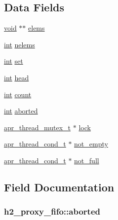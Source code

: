 \subsection*{Data Fields}
\begin{DoxyCompactItemize}
\item 
\hyperlink{group__MOD__ISAPI_gacd6cdbf73df3d9eed42fa493d9b621a6}{void} $\ast$$\ast$ \hyperlink{structh2__proxy__fifo_a78e95da59626360d3d43967d0aa59b51}{elems}
\item 
\hyperlink{pcre_8txt_a42dfa4ff673c82d8efe7144098fbc198}{int} \hyperlink{structh2__proxy__fifo_a8868b12a4b54cc50cc0d40f05722db0c}{nelems}
\item 
\hyperlink{pcre_8txt_a42dfa4ff673c82d8efe7144098fbc198}{int} \hyperlink{structh2__proxy__fifo_a89ffed46d24de481f119508708e243ee}{set}
\item 
\hyperlink{pcre_8txt_a42dfa4ff673c82d8efe7144098fbc198}{int} \hyperlink{structh2__proxy__fifo_a3d0d42fee96f75fa7033c492f369ea7f}{head}
\item 
\hyperlink{pcre_8txt_a42dfa4ff673c82d8efe7144098fbc198}{int} \hyperlink{structh2__proxy__fifo_adc6a464421d736bf4d23b9724e680c96}{count}
\item 
\hyperlink{pcre_8txt_a42dfa4ff673c82d8efe7144098fbc198}{int} \hyperlink{structh2__proxy__fifo_a97213970b2feb18c476930f2cfdb75bf}{aborted}
\item 
\hyperlink{structapr__thread__mutex__t}{apr\+\_\+thread\+\_\+mutex\+\_\+t} $\ast$ \hyperlink{structh2__proxy__fifo_a637d5c9fa02716a923058326742a4318}{lock}
\item 
\hyperlink{structapr__thread__cond__t}{apr\+\_\+thread\+\_\+cond\+\_\+t} $\ast$ \hyperlink{structh2__proxy__fifo_a95b47f447bf33aae8528d2b2bd805416}{not\+\_\+empty}
\item 
\hyperlink{structapr__thread__cond__t}{apr\+\_\+thread\+\_\+cond\+\_\+t} $\ast$ \hyperlink{structh2__proxy__fifo_ad572180d4bd8ba94a6f469a05dfe68b6}{not\+\_\+full}
\end{DoxyCompactItemize}


\subsection{Field Documentation}
\subsubsection[{\texorpdfstring{aborted}{aborted}}]{ h2\+\_\+proxy\+\_\+fifo\+::aborted}\hypertarget{structh2__proxy__fifo_a97213970b2feb18c476930f2cfdb75bf}{}\label{structh2__proxy__fifo_a97213970b2feb18c476930f2cfdb75bf}
